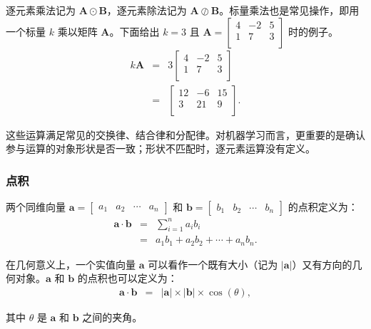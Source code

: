 逐元素乘法记为 $\mathbf{A}\odot\mathbf{B}$，逐元素除法记为 $\mathbf{A}\oslash\mathbf{B}$。标量乘法也是常见操作，即用一个标量 $k$ 乘以矩阵 $\mathbf{A}$。下面给出 $k=3$ 且 $\textbf{A} = \begin{bmatrix} 4 & -2 & 5 \\ 1 & 7 & 3 \\ \end{bmatrix}$ 时的例子。
\begin{eqnarray}
k \mathbf{A} & = & 3
\begin{bmatrix}
4 & -2 & 5 \\
1 & 7 & 3 \\
\end{bmatrix}
\nonumber \\
& = &
\begin{bmatrix}
12 & -6 & 15 \\
3 & 21 & 9 \\
\end{bmatrix}.
\end{eqnarray}

这些运算满足常见的交换律、结合律和分配律。对机器学习而言，更重要的是确认参与运算的对象形状是否一致；形状不匹配时，逐元素运算没有定义。

\subsubsection{点积}

\noindent 两个同维向量 $\mathbf{a}=\begin{bmatrix}a_1 & a_2 & \cdots & a_n\end{bmatrix}$ 和 $\mathbf{b}=\begin{bmatrix}b_1 & b_2 & \cdots & b_n\end{bmatrix}$ 的点积定义为：
\begin{eqnarray}
\mathbf{a} \cdot \mathbf{b} & = & \sum_{i=1}^{n} a_i b_i \nonumber \\
                            & = & a_1 b_1 + a_2 b_2 +  \cdots + a_n b_n.
\end{eqnarray}

在几何意义上，一个实值向量 $\mathbf{a}$ 可以看作一个既有大小（记为 $|\mathbf{a}|$）又有方向的几何对象。$\mathbf{a}$ 和 $\mathbf{b}$ 的点积也可以定义为：
\begin{eqnarray}
\mathbf{a} \cdot \mathbf{b} & = & |\mathbf{a}| \times |\mathbf{b}| \times \cos(\theta),
\end{eqnarray}

\noindent 其中 $\theta$ 是 $\mathbf{a}$ 和 $\mathbf{b}$ 之间的夹角。

